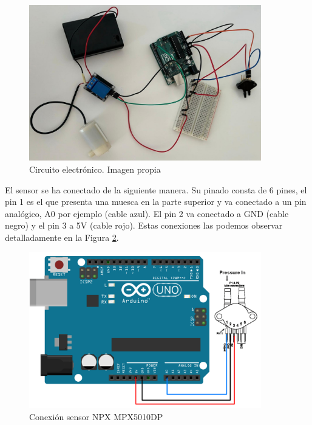 \begin{figure}[h]
    \centering
    \includegraphics[width=0.9\textwidth]{img/circuitocompleto.jpg}
    \caption{Circuito electrónico. Imagen propia}
    \label{fig:circuito}
\end{figure}

El sensor se ha conectado de la siguiente manera. Su pinado consta de 6 pines, el pin 1 es el que presenta una muesca en la parte superior y va conectado a un pin analógico, A0 por ejemplo (cable azul). El pin 2 va conectado a GND (cable negro) y el pin 3 a 5V (cable rojo). Estas conexiones las podemos observar detalladamente en la Figura \ref{fig:conex_sens}.
\begin{figure}[h]
    \centering
    \includegraphics[width=0.9\textwidth]{img/conexion_sensr.PNG}
    \caption{Conexión sensor NPX MPX5010DP \cite{conexsen}}
    \label{fig:conex_sens}
\end{figure}


